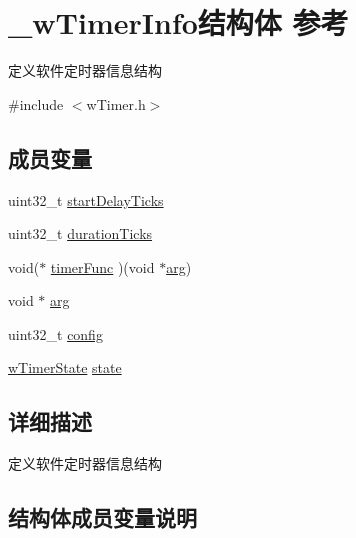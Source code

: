 \hypertarget{struct__w_timer_info}{}\section{\+\_\+w\+Timer\+Info结构体 参考}
\label{struct__w_timer_info}


定义软件定时器信息结构  




{\ttfamily \#include $<$w\+Timer.\+h$>$}

\subsection*{成员变量}
\begin{DoxyCompactItemize}
\item 
uint32\+\_\+t \mbox{\hyperlink{struct__w_timer_info_acecf013811265c398517a464e7e6f7b2}{start\+Delay\+Ticks}}
\item 
uint32\+\_\+t \mbox{\hyperlink{struct__w_timer_info_a95f8cbd7a4ba89fc9ae542eb04a24bc0}{duration\+Ticks}}
\item 
void($\ast$ \mbox{\hyperlink{struct__w_timer_info_a5b39f4308b8e715d9278cbf70f7297c7}{timer\+Func}} )(void $\ast$\mbox{\hyperlink{struct__w_timer_info_a9ce2ec4812a92cb6ab39f6e81e9173a9}{arg}})
\item 
void $\ast$ \mbox{\hyperlink{struct__w_timer_info_a9ce2ec4812a92cb6ab39f6e81e9173a9}{arg}}
\item 
uint32\+\_\+t \mbox{\hyperlink{struct__w_timer_info_ac0c635110dc503f164fff91b163936d7}{config}}
\item 
\mbox{\hyperlink{w_timer_8h_afd5ce485f9f6080eb16b9b0d11c09dcd}{w\+Timer\+State}} \mbox{\hyperlink{struct__w_timer_info_ac82a56d0e6704cdcfdad6e80803b1674}{state}}
\end{DoxyCompactItemize}


\subsection{详细描述}
定义软件定时器信息结构 

\subsection{结构体成员变量说明}
\mbox{\label{struct__w_timer_info_a9ce2ec4812a92cb6ab39f6e81e9173a9}} 
